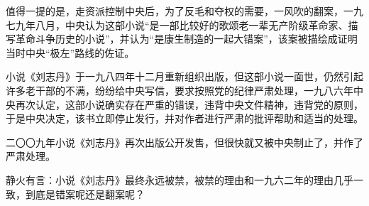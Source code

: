 \begin{maonote}
值得一提的是，走资派控制中央后，为了反毛和夺权的需要，一风吹的翻案，一九七九年八月，中央认为这部小说“是一部比较好的歌颂老一辈无产阶级革命家、描写革命斗争历史的小说”，并认为“是康生制造的一起大错案”，该案被描绘成证明当时中央“极左”路线的佐证。

小说《刘志丹》于一九八四年十二月重新组织出版，但这部小说一面世，仍然引起许多老干部的不满，纷纷给中央写信，要求按照党的纪律严肃处理，一九八六年中央再次认定，这部小说确实存在严重的错误，违背中央文件精神，违背党的原则，于是中央决定，该书立即停止发行，并对作者进行严肃的批评帮助和适当的处理。

二〇〇九年小说《刘志丹》再次出版公开发售，但很快就又被中央制止了，并作了严肃处理。

静火有言：小说《刘志丹》最终永远被禁，被禁的理由和一九六二年的理由几乎一致，到底是错案呢还是翻案呢？
\end{maonote}
